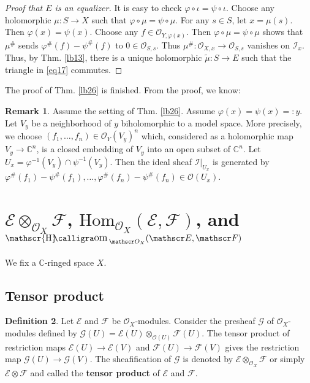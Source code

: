 \documentclass[12pt,b5paper,notitlepage]{report}
\theoremstyle{definition}
\newtheorem{df}{Definition}[section]
\newtheorem{rem}[df]{Remark}
\theoremstyle{plain}
\DeclareMathOperator{\shom}{\mathscr{H}\text{\kern -3pt {\calligra\large om}}\,}
\newcommand{\mc}{\mathcal}
\newcommand{\wtd}{\widetilde}
\newcommand{\Hom}{\mathrm{Hom}}
\newcommand{\scr}{\mathscr}
\newcommand{\Cbb}{\mathbb C}
\numberwithin{equation}{section}
\begin{document}
\begin{proof}[Proof that $E$ is an equalizer]
It is easy to check $\varphi\circ\iota=\psi\circ\iota$. Choose any holomorphic $\mu:S\rightarrow X$ such that $\varphi\circ\mu=\psi\circ\mu$. For any $s\in S$, let $x=\mu(s)$. Then $\varphi(x)=\psi(x)$. Choose any $f\in\scr O_{Y,\varphi(x)}$. Then $\varphi\circ\mu=\psi\circ\mu$ shows that $\mu^\#$ sends $\varphi^\#(f)-\psi^\#(f)$ to $0\in\scr O_{S,s}$. Thus $\mu^\#:\scr O_{X,x}\rightarrow\scr O_{S,s}$ vanishes on $\mc I_x$. Thus, by Thm. \ref{lb13}, there is a unique holomorphic $\wtd\mu:S\rightarrow E$ such that the triangle in \eqref{eq17} commutes.
\end{proof}
The proof of Thm. \ref{lb26} is finished. From the proof, we know:


\begin{rem}\label{lb38}
Assume the setting of Thm. \ref{lb26}. Assume $\varphi(x)=\psi(x)=:y$. Let $V_y$ be a neighborhood of $y$ biholomorphic to a model space. More precisely, we choose $(f_1,\dots,f_n)\in\scr O_Y(V_y)^n$ which, considered as a holomorphic map $V_y\rightarrow\Cbb^n$, is a closed embedding of $V_y$ into an open subset of $\Cbb^n$. Let $U_x=\varphi^{-1}(V_y)\cap\psi^{-1}(V_y)$. Then the ideal sheaf $\mc I|_{U_x}$ is generated by $\varphi^\#(f_1)-\psi^\#(f_1),\dots,\varphi^\#(f_n)-\psi^\#(f_n)\in\scr O(U_x)$.
\end{rem}




















\section{$\scr E\otimes_{\scr O_X}\scr F$, $\Hom_{\scr O_X}(\scr E,\scr F)$, and $\shom_{\scr O_X}(\scr E,\scr F)$ }


We fix a $\Cbb$-ringed space $X$. 

\subsection{Tensor product}



\begin{df}
Let $\scr E$ and $\scr F$ be $\scr O_X$-modules. Consider the presheaf $\scr G$ of $\scr O_X$-modules defined by $\scr G(U)=\scr E(U)\otimes_{\scr O(U)}\scr F(U)$. The tensor product of restriction maps $\scr E(U)\rightarrow\scr E(V)$ and $\scr F(U)\rightarrow\scr F(V)$ gives the restriction map $\scr G(U)\rightarrow\scr G(V)$. The sheafification of $\scr G$ is denoted by $\scr E\otimes_{\scr O_X}\scr F$ or simply $\scr E\otimes\scr F$ \index{00@Tensor product $\scr E\otimes_{\scr O_X}\scr F$} and called the \textbf{tensor product} of $\scr E$ and $\scr F$.
\end{df}
\end{document}
